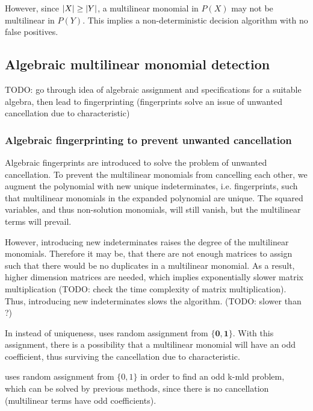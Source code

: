 However, since ${\left\vert X\right\vert} \geq {\left\vert Y\right\vert}$, a multilinear monomial in $P(X)$ may not be multilinear in $P(Y)$. 
This implies a non-deterministic decision algorithm with no false positives. 

\subsection{Algebraic multilinear monomial detection}

TODO: go through idea of algebraic assignment and specifications for a suitable algebra, 
then lead to fingerprinting (fingerprints solve an issue of unwanted cancellation due to characteristic)

\subsubsection{Algebraic fingerprinting to prevent unwanted cancellation}

Algebraic fingerprints are introduced to solve the problem of unwanted cancellation. 
To prevent the multilinear monomials from cancelling each other, 
we augment the polynomial with new unique indeterminates, i.e. fingerprints, 
such that multilinear monomials in the expanded polynomial are unique. 
The squared variables, and thus non-solution monomials, will still vanish, but 
the multilinear terms will prevail.

However, introducing new indeterminates raises the degree of the multilinear monomials. 
Therefore it may be, that there are not enough matrices to assign such that there would be no 
duplicates in a multilinear monomial. As a result, higher dimension matrices are needed, which 
implies exponentially slower matrix multiplication (TODO: check the time complexity of matrix multiplication). 
Thus, introducing new indeterminates slows the algorithm. (TODO: slower than ?)

In \cite{Koutis08} instead of uniqueness, \citeauthor{Koutis08} uses random assignment from $\{\mathbf{0}, \mathbf{1}\}$. 
With this assignment, there is a possibility that a multilinear monomial will have an odd coefficient, 
thus surviving the cancellation due to characteristic.

\citeauthor{Koutis08} uses random assignment from $\{0, 1\}$ in order to find an odd k-mld problem, which 
can be solved by previous methods, since there is no cancellation (multilinear terms have odd coefficients).



